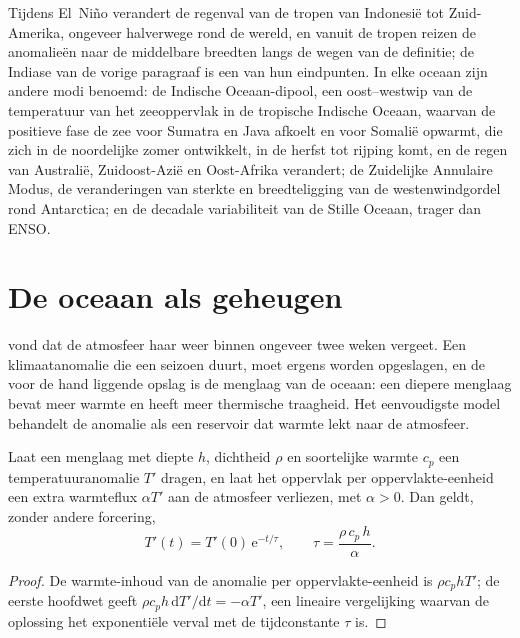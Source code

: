 Tijdens El~Niño verandert de regenval van de tropen van Indonesië tot Zuid-Amerika, ongeveer halverwege
rond de wereld, en vanuit de tropen reizen de anomalieën naar de middelbare breedten langs de wegen
van de definitie; de Indiase  van de vorige paragraaf is een van hun eindpunten. In elke oceaan zijn andere modi
benoemd: de Indische Oceaan-dipool, een oost--westwip van de temperatuur van het
zeeoppervlak in de tropische Indische Oceaan, waarvan de positieve fase de zee voor Sumatra en Java afkoelt
en voor Somalië opwarmt, die zich in de noordelijke zomer ontwikkelt, in de herfst tot rijping komt, en
de regen van Australië, Zuidoost-Azië en Oost-Afrika verandert; de Zuidelijke Annulaire Modus, de veranderingen van
sterkte en breedteligging van de westenwindgordel rond Antarctica; en de decadale variabiliteit van de
Stille Oceaan, trager dan ENSO.

\section{De oceaan als geheugen}\label{sec:b2:climate-variability:memory}

 vond dat de atmosfeer haar weer binnen ongeveer twee weken vergeet.
Een klimaatanomalie die een seizoen duurt, moet ergens worden opgeslagen, en de voor de hand liggende opslag is de menglaag
van de oceaan: een diepere menglaag bevat meer warmte en heeft meer thermische traagheid. Het eenvoudigste model behandelt de
anomalie als een reservoir dat warmte lekt naar de atmosfeer.

\begin{proposition}\label{prop:b2:climate-variability:damping}
Laat een menglaag met diepte $h$, dichtheid $\rho$ en soortelijke warmte $c_p$ een temperatuuranomalie
$T'$ dragen, en laat het oppervlak per oppervlakte-eenheid een extra warmteflux $\alpha T'$ aan de atmosfeer verliezen,
met $\alpha > 0$. Dan geldt, zonder andere forcering,
\[
  T'(t) = T'(0)\,\mathrm{e}^{-t/\tau}, \qquad \tau = \frac{\rho\,c_p\,h}{\alpha} .
\]
\end{proposition}

\begin{proof}
De warmte-inhoud van de anomalie per oppervlakte-eenheid is $\rho c_p h T'$; de eerste hoofdwet geeft $\rho c_p h
\,\mathrm{d}T'/\mathrm{d}t = -\alpha T'$, een lineaire vergelijking waarvan de oplossing het exponentiële
verval met de tijdconstante $\tau$ is.
\end{proof}

